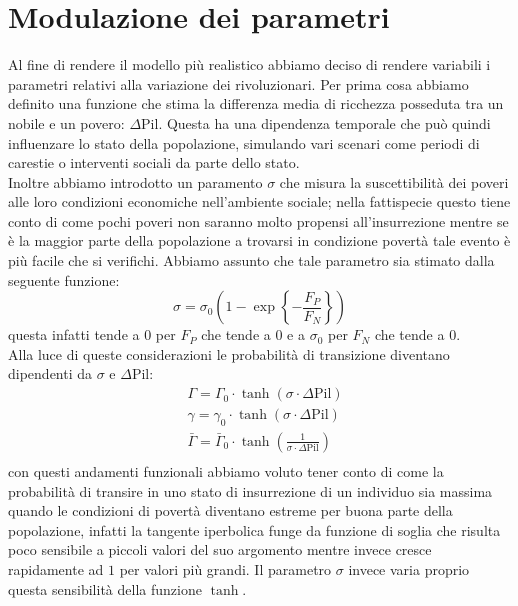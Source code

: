 \section{Modulazione dei parametri}
Al fine di rendere il modello più realistico abbiamo deciso di rendere variabili i parametri relativi alla variazione dei rivoluzionari. Per prima cosa abbiamo definito una funzione che stima la differenza media di ricchezza posseduta tra un nobile e un povero: $\Delta\text{Pil}$. Questa ha una dipendenza temporale che può quindi influenzare lo stato della popolazione, simulando vari scenari come periodi di carestie o interventi sociali da parte dello stato.\\
Inoltre abbiamo introdotto un paramento $\sigma$ che misura la suscettibilità dei poveri alle loro condizioni economiche nell'ambiente sociale; nella fattispecie questo tiene conto di come pochi poveri non saranno molto propensi all'insurrezione mentre se è la maggior parte della popolazione a trovarsi in condizione povertà tale evento è più facile che si verifichi. Abbiamo assunto che tale parametro sia stimato dalla seguente funzione: 
\begin{equation}
	\sigma= \sigma_0\left(1-\exp\left\{-\frac{F_P}{F_N}\right\}\right)
\end{equation}
questa infatti tende a $0$ per $F_P$ che tende a $0$ e a $\sigma_0$ per $F_N$ che tende a $0$.\\
Alla luce di queste considerazioni le probabilità di transizione diventano dipendenti da $\sigma$ e $\Delta\text{Pil}$:
\begin{equation}
	\begin{aligned}
	&\Gamma=\Gamma_{0}\cdot\tanh\left(\sigma\cdot \Delta\text{Pil}\right)\\
	&\gamma=\gamma_{0}\cdot\tanh\left(\sigma\cdot \Delta\text{Pil}\right)\\
	&\bar{\Gamma}=\bar{\Gamma}_{0}\cdot\tanh\left(\frac{1}{\sigma\cdot \Delta\text{Pil}}\right)\\
	\end{aligned}
\end{equation}
con questi andamenti funzionali abbiamo voluto tener conto di come la probabilità di transire in uno stato di insurrezione di un individuo sia massima quando le condizioni di povertà diventano estreme per buona parte della popolazione, infatti la tangente iperbolica funge da funzione di soglia che risulta poco sensibile a piccoli valori del suo argomento mentre invece cresce rapidamente ad $1$ per valori più grandi. Il parametro $\sigma$ invece varia proprio questa sensibilità della funzione $\tanh$.\\
